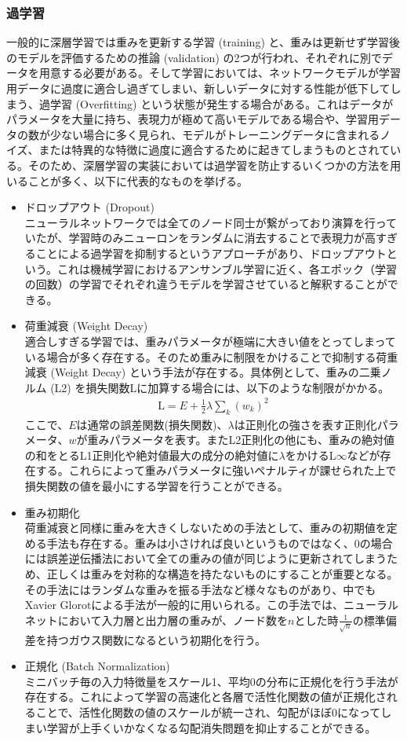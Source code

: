 \subsubsection{過学習}
一般的に深層学習では重みを更新する学習 (training) と、重みは更新せず学習後のモデルを評価するための推論 (validation) の2つが行われ、それぞれに別でデータを用意する必要がある。そして学習においては、ネットワークモデルが学習用データに過度に適合し過ぎてしまい、新しいデータに対する性能が低下してしまう、過学習 (Overfitting) という状態が発生する場合がある。これはデータがパラメータを大量に持ち、表現力が極めて高いモデルである場合や、学習用データの数が少ない場合に多く見られ、モデルがトレーニングデータに含まれるノイズ、または特異的な特徴に過度に適合するために起きてしまうものとされている。そのため、深層学習の実装においては過学習を防止するいくつかの方法を用いることが多く、以下に代表的なものを挙げる。
\begin{itemize}
\item ドロップアウト (Dropout)\\
ニューラルネットワークでは全てのノード同士が繋がっており演算を行っていたが、学習時のみニューロンをランダムに消去することで表現力が高すぎることによる過学習を抑制するというアプローチがあり、ドロップアウトという。これは機械学習におけるアンサンブル学習に近く、各エポック（学習の回数）の学習でそれぞれ違うモデルを学習させていると解釈することができる。
\item 荷重減衰 (Weight Decay)\\
適合しすぎる学習では、重みパラメータが極端に大きい値をとってしまっている場合が多く存在する。そのため重みに制限をかけることで抑制する荷重減衰 (Weight Decay) という手法が存在する。具体例として、重みの二乗ノルム (L2) を損失関数$\mathrm{L}$に加算する場合には、以下のような制限がかかる。
\begin{align}
\mathrm{L} = E + \frac{1}{2}\lambda \sum_k {(w_k)}^2
\end{align}
ここで、$E$は通常の誤差関数(損失関数)、$\lambda$は正則化の強さを表す正則化パラメータ、$w$が重みパラメータを表す。またL2正則化の他にも、重みの絶対値の和をとるL1正則化や絶対値最大の成分の絶対値に$\lambda$をかけるL$\infty$などが存在する。これらによって重みパラメータに強いペナルティが課せられた上で損失関数の値を最小にする学習を行うことができる。
\item 重み初期化\\
荷重減衰と同様に重みを大きくしないための手法として、重みの初期値を定める手法も存在する。重みは小さければ良いというものではなく、0の場合には誤差逆伝播法において全ての重みの値が同じように更新されてしまうため、正しくは重みを対称的な構造を持たないものにすることが重要となる。その手法にはランダムな重みを振る手法など様々なものがあり、中でもXavier Glorotによる手法\cite{init}が一般的に用いられる。この手法では、ニューラルネットにおいて入力層と出力層の重みが、ノード数を$n$とした時$\frac{1}{\sqrt{n}}$の標準偏差を持つガウス関数になるという初期化を行う。
\item 正規化 (Batch Normalization)\\
ミニバッチ毎の入力特徴量をスケール1、平均0の分布に正規化を行う手法が存在する。これによって学習の高速化と各層で活性化関数の値が正規化されることで、活性化関数の値のスケールが統一され、勾配がほぼ0になってしまい学習が上手くいかなくなる勾配消失問題を抑止することができる。
\end{itemize}
